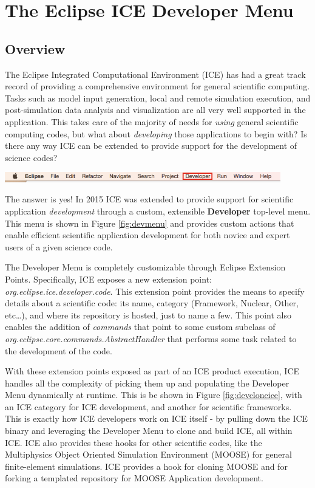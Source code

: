 \documentclass{article}
\begin{document}
\section{The Eclipse ICE Developer Menu}

\subsection{Overview}
The Eclipse Integrated Computational Environment (ICE) has had a great track
record of providing a comprehensive environment for general scientific
computing. Tasks such as model input generation, local and remote simulation
execution, and post-simulation data analysis and visualization are all very well
supported in the application. This takes care of the majority of needs for
\emph{using} general scientific computing codes, but what about
\emph{developing} those applications to begin with? Is there 
any way ICE can be extended to provide
support for the development of science codes? 

\begin{center}
\includegraphics[width=12cm]{figures/icemenu.png}
\label{fig:devmenu}
\end{center}

The answer is yes! In 2015 ICE was extended to provide support for scientific
application \emph{development} through a custom, extensible \textbf{Developer} 
top-level menu. This menu is shown in Figure
\ref{fig:devmenu} and provides custom actions that enable efficient scientific
application development for both novice and expert users of a given science
code.

The Developer Menu is completely customizable through Eclipse Extension Points.
Specifically, ICE exposes a new extension point:
\emph{org.eclipse.ice.developer.code}. This extension point provides the means
to specify details about a scientific code: its name, category (Framework,
Nuclear, Other, etc\ldots), and where its repository is hosted, just to name a
few. This point also enables the addition of \emph{commands} that point to some
custom subclass of \emph{org.eclipse.core.commands.AbstractHandler} that
performs some task related to the development of the code. 

With these extension points exposed as part of an ICE product execution, ICE
handles all the complexity of picking them up and populating the Developer Menu
dynamically at runtime. This is be shown in Figure \ref{fig:devcloneice}, with
an ICE category for ICE development, and another for scientific frameworks. This
is exactly how ICE developers work on ICE itself - by pulling down the ICE
binary and leveraging the Developer Menu to clone and build ICE, all within ICE.
ICE also provides these hooks for other scientific codes, like the Multiphysics
Object Oriented Simulation Environment (MOOSE) for general finite-element
simulations. ICE provides a hook for cloning MOOSE and for forking a templated
repository for MOOSE Application development.
\end{document}
